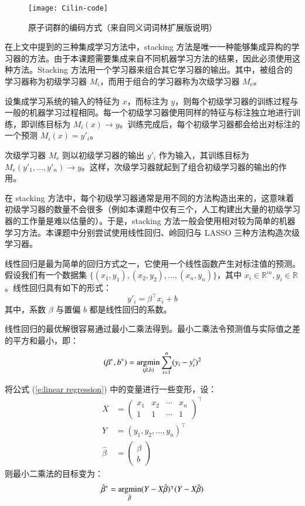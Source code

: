 \begin{figure}[h]
	\centering
	\texttt{[image: Cilin-code]}
	\caption{原子词群的编码方式（来自同义词词林扩展版说明）}
	\label{f:cilin code}
	\vspace{-1em}
\end{figure}

在上文中提到的三种集成学习方法中，stacking 方法是唯一一种能够集成异构的学习器的方法。由于本课题需要集成来自不同机器学习方法的结果，因此必须使用这种方法。Stacking 方法用一个学习器来组合其它学习器的输出。其中，被组合的学习器称为初级学习器 $M_i$，而用于组合的学习器称为次级学习器 $M_\text{e}$。

设集成学习系统的输入的特征为 $x$，而标注为 $y$，则每个初级学习器的训练过程与一般的机器学习过程相同。每一个初级学习器使用同样的特征与标注独立地进行训练，即训练目标为 $M_i(x) \rightarrow y$。训练完成后，每个初级学习器都会给出对标注的一个预测 $M_i(x) = y'_i$。

次级学习器 $M_\text{e}$ 则以初级学习器的输出 $y'_i$ 作为输入，其训练目标为 $M_\text{e}(y'_1, \dots, y'_n) \rightarrow y$。这样，次级学习器就起到了组合初级学习器的输出的作用。

在 stacking 方法中，每个初级学习器通常是用不同的方法构造出来的，这意味着初级学习器的数量不会很多（例如本课题中仅有三个，人工构建出大量的初级学习器的工作量是难以估量的）。于是，stacking 方法一般会使用相对较为简单的机器学习方法。本课题中分别尝试使用线性回归、岭回归与 LASSO 三种方法构造次级学习器。

线性回归是最为简单的回归方式之一，它使用一个线性函数产生对标注值的预测。假设我们有一个数据集 $\bigl\{(x_1, y_1), (x_2, y_2), \dots, (x_n, y_n)\bigr\}$，其中 $x_i \in \mathbb{R}^m, y_i \in \mathbb{R}$。线性回归具有如下的形式：
\begin{equation}
y'_i = \beta^\intercal x_i + b
\label{e:linear regression}
\end{equation}
其中，系数 $\beta$ 与置偏 $b$ 都是线性回归的系数。

线性回归的最优解很容易通过最小二乘法得到。最小二乘法令预测值与实际值之差的平方和最小，即：
\begin{equation}
(\beta^*, b^*) = \operatorname*{argmin}_{(\beta, b)} \sum_{i = 1}^{n} (y_i - y'_i)^2
\end{equation}

将公式 (\ref{e:linear regression}) 中的变量进行一些变形，设：
\begin{align}
	X &=
	\begin{pmatrix}
		x_1 & x_2 & \cdots & x_n \\
		1 & 1 & \cdots & 1
	\end{pmatrix}^\intercal \\
	Y &= (y_1, y_2, \dots, y_n)^\intercal\\
	\hat{\beta} &=
	\begin{pmatrix}
		\beta \\
		b
	\end{pmatrix}
\end{align}
则最小二乘法的目标变为：
\begin{equation}
\hat{\beta}^* = \operatorname*{argmin}_{\hat{\beta}} (Y - X \hat{\beta})^\intercal (Y - X \hat{\beta})
\end{equation}

